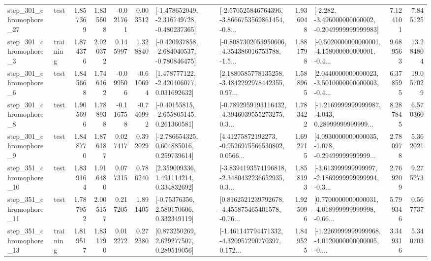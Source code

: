 \begin{tabular}{llrrrrllrlrr}
  step\_301\_chromophore\_27 &      test &      1.857369 &    1.835608 &     -0.021761 &  0.003512 &  [-1.478652049, -2.316749728, -0.480237365] &  [-2.570525846764396, -3.8666753569861454, -0.8... &       1.936048 &  [-2.282, -3.496000000000002, -0.2049999999999983] &            7.124101 &          7.845125 \\
   step\_301\_chromophore\_3 &  training &      1.874376 &    2.020372 &      0.145997 &  1.328840 &  [-0.420937858, -2.684040537, -0.780846475] &  [-0.8087302053950606, -4.354386016753788, -1.5... &       1.881798 &  [-0.5020000000000001, -4.158000000000001, -0.4... &            9.689563 &         13.284804 \\
   step\_301\_chromophore\_6 &      test &      1.845668 &    1.746162 &     -0.099506 & -0.610694 &    [1.478777122, -2.420406077, 0.031692632] &  [2.1880585778135258, -3.4842292978442355, 0.97... &       1.588965 &  [2.0440000000000023, -3.5010000000000003, -0.4... &            6.378595 &         19.057029 \\
   step\_301\_chromophore\_8 &      test &      1.905696 &    1.788938 &     -0.116758 & -0.746992 &    [-0.40155815, -2.655805145, 0.261360581] &  [-0.7892959193116432, -4.3946039555273275, 0.3... &       1.783422 &  [-1.2169999999999987, -4.043, 0.28999999999999... &            8.287845 &          6.570360 \\
   step\_301\_chromophore\_9 &      test &      1.848770 &    1.876187 &      0.027417 &  0.392029 &    [-2.786654325, 0.604885016, 0.259739614] &  [4.41275872192273, -0.9526975566530802, 0.0566... &       1.692715 &  [4.0930000000000035, -1.078, -0.29499999999999... &            2.780978 &          5.362021 \\
  step\_351\_chromophore\_10 &      test &      1.839164 &    1.916480 &      0.077315 &  0.786240 &     [2.359009336, 1.491114214, 0.334832692] &  [-3.8394193574196818, -2.3480432236652935, 0.3... &       1.858193 &  [-3.613999999999997, -2.1869999999999994, -0.3... &            2.769209 &          9.275273 \\
  step\_351\_chromophore\_11 &      test &      1.787952 &    2.005157 &      0.217205 &  1.891405 &     [-0.75376356, 2.580170606, 0.332349119] &  [0.8162521239792678, -4.455875465401578, -0.76... &       1.925096 &  [0.7700000000000031, -4.018999999999998, -0.66... &            5.799346 &          0.567737 \\
  step\_351\_chromophore\_13 &  training &      1.819517 &    1.831790 &      0.012272 &  0.272380 &     [0.873250269, 2.629277507, 0.289519056] &  [-1.461147794471332, -4.320957290770397, 0.172... &       1.849525 &  [-1.2269999999999968, -4.0120000000000005, -0.... &            3.349316 &          5.340703 \\

\end{tabular}

